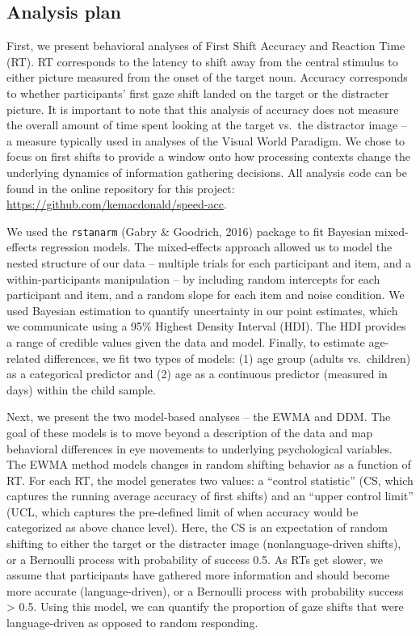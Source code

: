 \documentclass[english,floatsintext,man]{apa6}
\theoremstyle{definition}
\theoremstyle{definition}
\theoremstyle{definition}
\theoremstyle{remark}
\begin{document}
\hypertarget{analysis-plan}{%
\subsection{Analysis plan}\label{analysis-plan}}

First, we present behavioral analyses of First Shift Accuracy and
Reaction Time (RT). RT corresponds to the latency to shift away from the
central stimulus to either picture measured from the onset of the target
noun. Accuracy corresponds to whether participants' first gaze shift
landed on the target or the distracter picture. It is important to note
that this analysis of accuracy does not measure the overall amount of
time spent looking at the target vs.~the distractor image -- a measure
typically used in analyses of the Visual World Paradigm. We chose to
focus on first shifts to provide a window onto how processing contexts
change the underlying dynamics of information gathering decisions. All
analysis code can be found in the online repository for this project:
\url{https://github.com/kemacdonald/speed-acc}.

We used the \texttt{rstanarm} (Gabry \& Goodrich, 2016) package to fit
Bayesian mixed-effects regression models. The mixed-effects approach
allowed us to model the nested structure of our data -- multiple trials
for each participant and item, and a within-participants manipulation --
by including random intercepts for each participant and item, and a
random slope for each item and noise condition. We used Bayesian
estimation to quantify uncertainty in our point estimates, which we
communicate using a 95\% Highest Density Interval (HDI). The HDI
provides a range of credible values given the data and model. Finally,
to estimate age-related differences, we fit two types of models: (1) age
group (adults vs.~children) as a categorical predictor and (2) age as a
continuous predictor (measured in days) within the child sample.

Next, we present the two model-based analyses -- the EWMA and DDM. The
goal of these models is to move beyond a description of the data and map
behavioral differences in eye movements to underlying psychological
variables. The EWMA method models changes in random shifting behavior as
a function of RT. For each RT, the model generates two values: a
\enquote{control statistic} (CS, which captures the running average
accuracy of first shifts) and an \enquote{upper control limit} (UCL,
which captures the pre-defined limit of when accuracy would be
categorized as above chance level). Here, the CS is an expectation of
random shifting to either the target or the distracter image
(nonlanguage-driven shifts), or a Bernoulli process with probability of
success 0.5. As RTs get slower, we assume that participants have
gathered more information and should become more accurate
(language-driven), or a Bernoulli process with probability success
\textgreater{} 0.5. Using this model, we can quantify the proportion of
gaze shifts that were language-driven as opposed to random responding.
\end{document}
